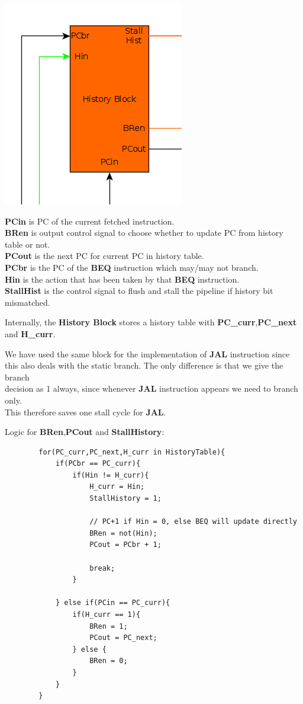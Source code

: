 \documentclass{article}
\begin{document}
\includegraphics[scale=0.5]{history_block}

\textbf{PCin} is PC of the current fetched instruction.\\
\textbf{BRen} is output control signal to choose whether to update PC from
history table or not.\\
\textbf{PCout} is the next PC for current PC in history table.\\

\textbf{PCbr} is the PC of the \textbf{BEQ} instruction which may/may not branch.\\
\textbf{Hin} is the action that has been taken by that \textbf{BEQ} instruction.\\

\textbf{StallHist} is the control signal to flush and stall the pipeline if
history bit mismatched.

Internally, the \textbf{History Block} stores a history table with 
\textbf{PC\_curr},\textbf{PC\_next} and \textbf{H\_curr}.

We have used the same block for the implementation of \textbf{JAL} instruction since\\
this also deals with the static branch. The only difference is that we give the branch\\
decision as 1 always, since whenever \textbf{JAL} instruction appears we need to branch only.\\
This therefore saves one stall cycle for \textbf{JAL}.

Logic for \textbf{BRen},\textbf{PCout} and \textbf{StallHistory}:
    \begin{lstlisting}
        for(PC_curr,PC_next,H_curr in HistoryTable){
            if(PCbr == PC_curr){
                if(Hin != H_curr){
                    H_curr = Hin;
                    StallHistory = 1;

                    // PC+1 if Hin = 0, else BEQ will update directly
                    BRen = not(Hin);
                    PCout = PCbr + 1; 

                    break;
                }

            } else if(PCin == PC_curr){
                if(H_curr == 1){
                    BRen = 1;
                    PCout = PC_next;
                } else {
                    BRen = 0;
                }
            }
        }
    \end{lstlisting}
\end{document}
